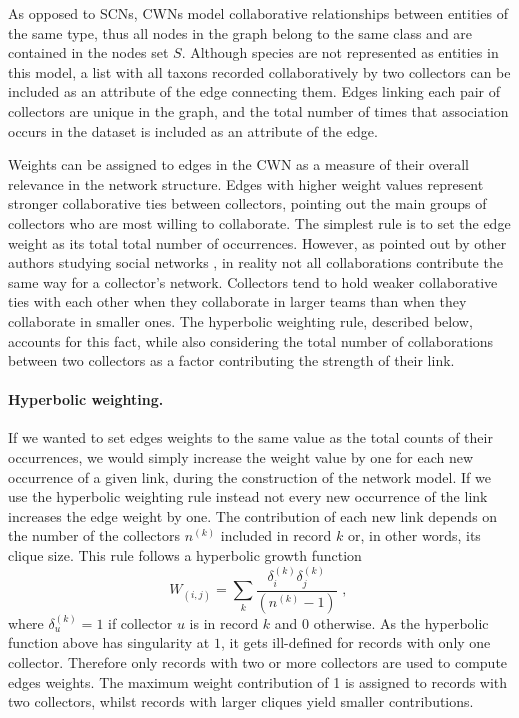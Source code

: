 As opposed to SCNs, CWNs model collaborative relationships between entities of the same type, thus all nodes in the graph belong to the same class and are contained in the nodes set $S$. 
Although species are not represented as entities in this model, a list with all taxons recorded collaboratively by two collectors can be included as an attribute of the edge connecting them. 
Edges linking each pair of collectors are unique in the graph, and the total number of times that association occurs in the dataset is included as an attribute of the edge.


Weights can be assigned to edges in the CWN as a measure of their overall relevance in the network structure. Edges with higher weight values represent stronger collaborative ties between collectors, pointing out the main groups of collectors who are most willing to collaborate. 
The simplest rule is to set the edge weight as its total total number of occurrences. However, as pointed out by other authors studying social networks \cite{Newman2001a}, in reality not all collaborations contribute the same way for a collector's network. 
Collectors tend to hold weaker collaborative ties with each other when they collaborate in larger teams than when they collaborate in smaller ones. The hyperbolic weighting rule, described below, accounts for this fact, while also considering the total number of collaborations between two collectors as a factor contributing the strength of their link.

\paragraph*{Hyperbolic weighting.}
If we wanted to set edges weights to the same value as the total counts of their occurrences, we would simply increase the weight value by one for each new occurrence of a given link, during the construction of the network model. 
If we use the hyperbolic weighting rule instead not every new occurrence of the link increases the edge weight by one. 
The contribution of each new link depends on the number of the collectors $n^{(k)}$ included in record $k$ or, in other words, its clique size. 
This rule follows a hyperbolic growth function 
\begin{equation}
W_{(i,j)} = \sum\limits_k \frac{\delta_i^{(k)} \delta_j^{(k)}}{(n^{(k)}-1)} \mbox{ , }
\end{equation}
where $\delta^{(k)}_u = 1$ if collector $u$ is in record $k$ and $0$ otherwise.
As the hyperbolic function above has singularity at $1$, it gets ill-defined for records with only one collector. 
Therefore only records with two or more collectors are used to compute edges weights. 
The maximum weight contribution of 1 is assigned to records with two collectors, whilst records with larger cliques yield smaller contributions.\\


